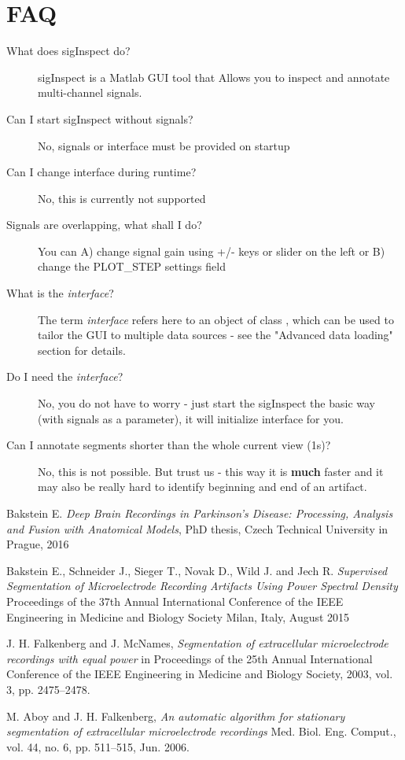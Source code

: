\documentclass[a4paper,10pt]{article}
\begin{document}
\section{FAQ}
\begin{description}
	\item[What does sigInspect do?] sigInspect is a Matlab GUI tool that Allows you to inspect and annotate multi-channel signals.
	\item[Can I start sigInspect without signals?] No, signals or interface must be provided on startup
	\item[Can I change interface during runtime?] No, this is currently not supported
	\item[Signals are overlapping, what shall I do?] You can A) change signal gain using +/- keys or slider on the left or B) change the PLOT\_STEP settings field
\item[What is the \emph{interface}?] The term \emph{interface} refers here to an object of class , which can be used to tailor the GUI to multiple data sources - see the "Advanced data loading" section for details.
\item[Do I need the \emph{interface}?] No, you do not have to worry - just start the sigInspect the basic way (with signals as a parameter), it will initialize  interface for you.

	\item[Can I annotate segments shorter than the whole current view (1s)?] No, this is not possible. But trust us - this way it is \textbf{much} faster and it may also be really hard to identify beginning and end of an artifact.
\end{description}

\begin{thebibliography}{9}	
	Bakstein E.	\emph{Deep Brain Recordings in Parkinson's Disease: Processing, Analysis and Fusion with Anatomical Models}, PhD thesis, Czech Technical University in Prague, 2016

	Bakstein E., Schneider J., Sieger T., Novak D., Wild J. and Jech R.
	\emph{Supervised Segmentation of Microelectrode Recording Artifacts Using Power Spectral Density}
	Proceedings of the 37th Annual International Conference of the IEEE Engineering in Medicine and Biology Society
	Milan, Italy,
	August 2015
	
 J. H. Falkenberg and J. McNames, \emph{Segmentation of extracellular microelectrode recordings with equal power} in Proceedings of the 25th Annual International Conference of the IEEE Engineering in Medicine and Biology Society, 2003, vol. 3, pp. 2475–2478.

 M. Aboy and J. H. Falkenberg, \emph{An automatic algorithm for stationary segmentation of extracellular microelectrode recordings} Med. Biol. Eng. Comput., vol. 44, no. 6, pp. 511–515, Jun. 2006.
	
\end{thebibliography}
\end{document}
